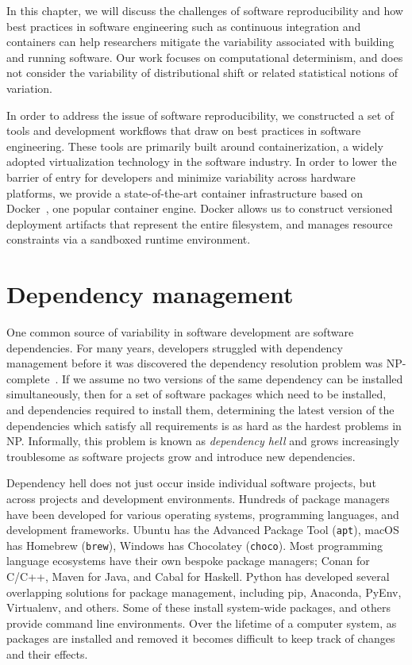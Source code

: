\documentclass[12pt,initial,twoside,maitrise]{dms}
\numberwithin{equation}{section}
\numberwithin{table}{chapter}
\numberwithin{figure}{chapter}
\begin{document}
In this chapter, we will discuss the challenges of software reproducibility and how best practices in software engineering such as continuous integration and containers can help researchers mitigate the variability associated with building and running software. Our work focuses on computational determinism, and does not consider the variability of distributional shift or related statistical notions of variation.

In order to address the issue of software reproducibility, we constructed a set of tools and development workflows that draw on best practices in software engineering. These tools are primarily built around containerization, a widely adopted virtualization technology in the software industry. In order to lower the barrier of entry for developers and minimize variability across hardware platforms, we provide a state-of-the-art container infrastructure based on Docker~\cite{merkel2014docker}, one popular container engine. Docker allows us to construct versioned deployment artifacts that represent the entire filesystem, and manages resource constraints via a sandboxed runtime environment.

\section{Dependency management}\label{sec:dependency-management}

One common source of variability in software development are software dependencies. For many years, developers struggled with dependency management before it was discovered the dependency resolution problem was NP-complete~\cite{abate2012dependency}. If we assume no two versions of the same dependency can be installed simultaneously, then for a set of software packages which need to be installed, and dependencies required to install them, determining the latest version of the dependencies which satisfy all requirements is as hard as the hardest problems in NP. Informally, this problem is known as \textit{dependency hell} and grows increasingly troublesome as software projects grow and introduce new dependencies.

Dependency hell does not just occur inside individual software projects, but across projects and development environments. Hundreds of package managers have been developed for various operating systems, programming languages, and development frameworks. Ubuntu has the Advanced Package Tool (\texttt{apt}), macOS has Homebrew (\texttt{brew}), Windows has Chocolatey (\texttt{choco}). Most programming language ecosystems have their own bespoke package managers; Conan for C/C++, Maven for Java, and Cabal for Haskell. Python has developed several overlapping solutions for package management, including pip, Anaconda, PyEnv, Virtualenv, and others. Some of these install system-wide packages, and others provide command line environments. Over the lifetime of a computer system, as packages are installed and removed it becomes difficult to keep track of changes and their effects.
\end{document}
